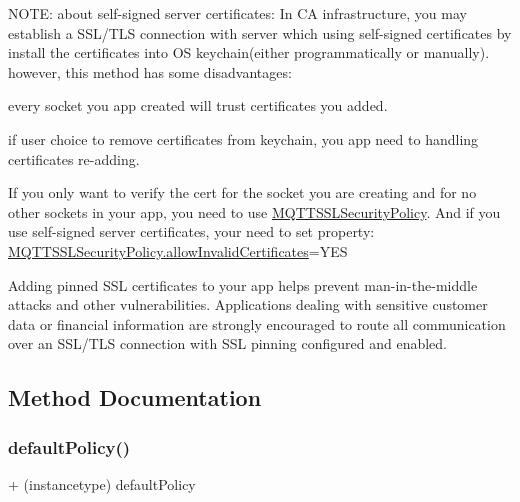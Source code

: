 N\+O\+TE\+: about self-\/signed server certificates\+: In CA infrastructure, you may establish a S\+S\+L/\+T\+LS connection with server which using self-\/signed certificates by install the certificates into OS keychain(either programmatically or manually). however, this method has some disadvantages\+:
\begin{DoxyEnumerate}
\item every socket you app created will trust certificates you added.
\item if user choice to remove certificates from keychain, you app need to handling certificates re-\/adding.
\end{DoxyEnumerate}

If you only want to verify the cert for the socket you are creating and for no other sockets in your app, you need to use \hyperlink{interface_m_q_t_t_s_s_l_security_policy}{M\+Q\+T\+T\+S\+S\+L\+Security\+Policy}. And if you use self-\/signed server certificates, your need to set property\+: \hyperlink{interface_m_q_t_t_s_s_l_security_policy_a42fe688d550833a1f903be92b72cf384}{M\+Q\+T\+T\+S\+S\+L\+Security\+Policy.\+allow\+Invalid\+Certificates}=Y\+ES

Adding pinned S\+SL certificates to your app helps prevent man-\/in-\/the-\/middle attacks and other vulnerabilities. Applications dealing with sensitive customer data or financial information are strongly encouraged to route all communication over an S\+S\+L/\+T\+LS connection with S\+SL pinning configured and enabled. 

\subsection{Method Documentation}
\mbox{\label{interface_m_q_t_t_s_s_l_security_policy_abf1594bd6fedb9222d1b4b72b972c59a}} 
\subsubsection{\texorpdfstring{default\+Policy()}{defaultPolicy()}}
{\footnotesize\ttfamily + (instancetype) default\+Policy \begin{DoxyParamCaption}{ }\end{DoxyParamCaption}}

